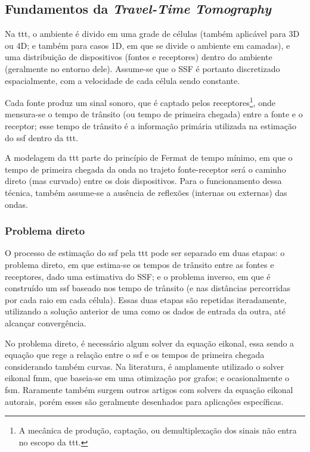 \subsection{Fundamentos da \textsl{Travel-Time Tomography}}
Na \gls{ttt}, o ambiente é divido em uma grade de células (também aplicável para 3D ou 4D; e também para casos 1D, em que se divide o ambiente em camadas), e uma {distribuição de dispositivos} (fontes e receptores) dentro do ambiente (geralmente no entorno dele). Assume-se que o SSF é portanto {discretizado espacialmente}, com a velocidade de cada célula sendo constante.

Cada fonte produz um sinal sonoro, que é captado pelos receptores\footnote{A mecânica de produção, captação, ou demultiplexação dos sinais não entra no escopo da \gls{ttt}.}, onde mensura-se o \gls{tempo de trânsito} (ou tempo de primeira chegada) entre a fonte e o receptor; esse tempo de trânsito é a informação primária utilizada na estimação do \gls{ssf} dentro da \gls{ttt}.

A modelagem da \gls{ttt} parte do {princípio de Fermat de tempo mínimo}, em que o tempo de primeira chegada da onda no trajeto fonte-receptor será o caminho direto (mas curvado) entre os dois dispositivos. Para o funcionamento dessa técnica, também assume-se a ausência de reflexões (internas ou externas) das ondas.

\subsubsection*{Problema direto}

O processo de estimação do \gls{ssf} pela \gls{ttt} pode ser separado em duas etapas: o {problema direto}, em que estima-se os tempos de trânsito entre as fontes e receptores, dado uma estimativa do SSF; e o {problema inverso}, em que é construído um \gls{ssf} baseado nos tempo de trânsito (e nas distâncias percorridas por cada raio em cada célula). Essas duas etapas são repetidas iteradamente, utilizando a solução anterior de uma como os dados de entrada da outra, até alcançar convergência.

No problema direto, é necessário algum solver da equação eikonal, essa sendo a equação que rege a relação entre o \gls{ssf} e os tempos de primeira chegada considerando também curvas. Na literatura, é amplamente utilizado o solver eikonal \gls{fmm}, que baseia-se em uma otimização por grafos; e ocasionalmente o \gls{fsm}. Raramente também surgem outros artigos com solvers da equação eikonal autorais, porém esses são geralmente desenhados para aplicações específicas.

